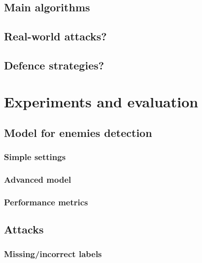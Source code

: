 \documentclass[14pt,a4paper]{extarticle}
\newcounter{e}
\numberwithin{equation}{section}
\numberwithin{figure}{section}
\begin{document}
    \subsection{Main algorithms}
    \subsection{Real-world attacks?}
    \subsection{Defence strategies?}

\newpage
\thispagestyle{empty}
\section{Experiments and evaluation}
    \subsection{Model for enemies detection}
        \subsubsection{Simple settings}
        \subsubsection{Advanced model}
        \subsubsection{Performance metrics}

    \subsection{Attacks}
    \subsubsection{Missing/incorrect labels}
\end{document}
